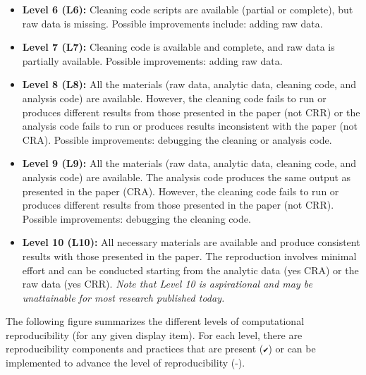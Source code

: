 \documentclass[
]{book}
\begin{document}
\begin{itemize}
\item
  \textbf{Level 6 (L6):} Cleaning code scripts are available (partial or complete), but raw data is missing. Possible improvements include: adding raw data.
\item
  \textbf{Level 7 (L7):} Cleaning code is available and complete, and raw data is partially available. Possible improvements: adding raw data.
\item
  \textbf{Level 8 (L8):} All the materials (raw data, analytic data, cleaning code, and analysis code) are available. However, the cleaning code fails to run or produces different results from those presented in the paper (not CRR) or the analysis code fails to run or produces results inconsistent with the paper (not CRA). Possible improvements: debugging the cleaning or analysis code.
\item
  \textbf{Level 9 (L9):} All the materials (raw data, analytic data, cleaning code, and analysis code) are available. The analysis code produces the same output as presented in the paper (CRA). However, the cleaning code fails to run or produces different results from those presented in the paper (not CRR). Possible improvements: debugging the cleaning code.
\item
  \textbf{Level 10 (L10):} All necessary materials are available and produce consistent results with those presented in the paper. The reproduction involves minimal effort and can be conducted starting from the analytic data (yes CRA) or the raw data (yes CRR). \emph{Note that Level 10 is aspirational and may be unattainable for most research published today.}
\end{itemize}

The following figure summarizes the different levels of computational reproducibility (for any given display item). For each level, there are reproducibility components and practices that are present (\texttt{✔}) or can be implemented to advance the level of reproducibility (-).
\end{document}

